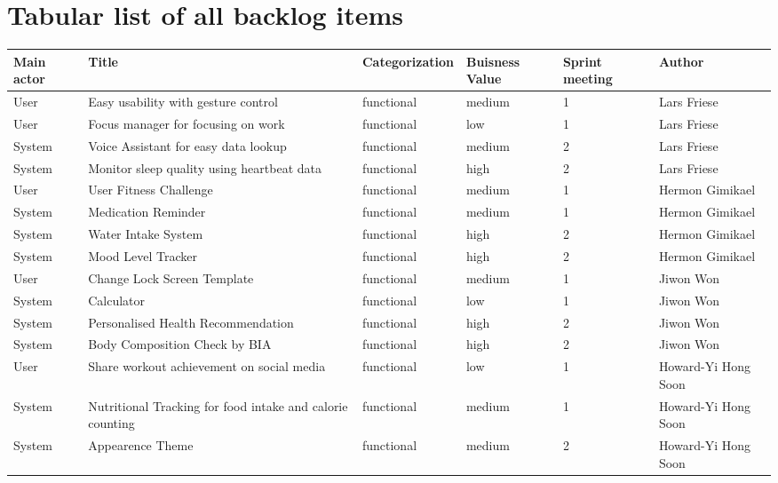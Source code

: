 \documentclass{article}
\begin{document}
\section{Tabular list of all backlog items}
\begin{center}
	\small
	\vspace{0cm}
	\begin{tabularx}{\textwidth}{|p{}|X|p{}|p{}|p{}|p{}|}
		\hline
		\textbf{Main actor} & \textbf{Title} & \textbf{Categorization} & \textbf{Buisness Value} & \textbf{Sprint meeting} & \textbf{Author} \\
		\hline
		User & Easy usability with gesture control & functional & medium & 1 & Lars Friese \\ \hline
		User & Focus manager for focusing on work & functional & low & 1 & Lars Friese \\ \hline
		System & Voice Assistant for easy data lookup & functional & medium & 2 & Lars Friese \\ \hline
		System & Monitor sleep quality using heartbeat data & functional & high & 2 & Lars Friese \\ \hline
        User & User Fitness Challenge & functional & medium & 1 & Hermon Gimikael \\ \hline
		System & Medication Reminder & functional & medium & 1 & Hermon Gimikael \\ \hline
		System & Water Intake System & functional & high & 2 & Hermon Gimikael \\ \hline
		System & Mood Level Tracker & functional & high & 2 & Hermon Gimikael \\ \hline
		User & Change Lock Screen Template & functional & medium &  1 & Jiwon Won \\ \hline
		System & Calculator & functional & low &  1 & Jiwon Won \\ \hline
		System & Personalised Health Recommendation & functional & high &  2 & Jiwon Won \\ \hline 
		System & Body Composition Check by BIA & functional & high &  2 & Jiwon Won \\ \hline
        User & Share workout achievement on social media & functional & low & 1 & Howard-Yi Hong Soon \\ \hline
        System & Nutritional Tracking for food intake and calorie counting & functional & medium & 1 & Howard-Yi Hong Soon \\ \hline
        System & Appearence Theme & functional & medium & 2 & Howard-Yi Hong Soon \\ \hline

\end{tabularx}
\end{center}
\end{document}
